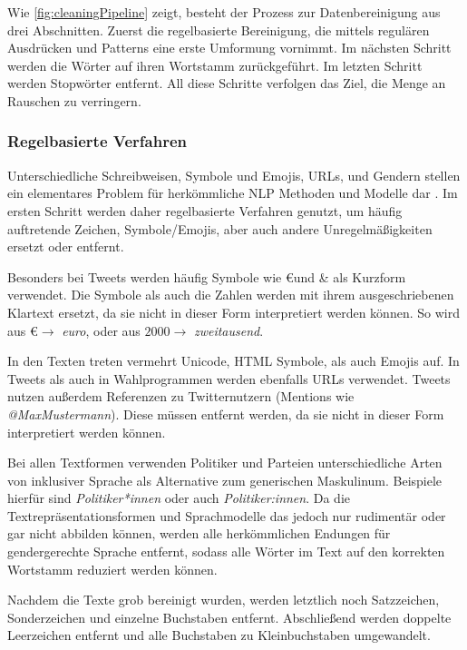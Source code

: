 Wie \autoref{fig:cleaningPipeline} zeigt, besteht der Prozess zur Datenbereinigung aus drei Abschnitten. Zuerst die regelbasierte Bereinigung, die mittels regulären Ausdrücken und Patterns eine erste Umformung vornimmt. Im nächsten Schritt werden die Wörter auf ihren Wortstamm zurückgeführt. Im letzten Schritt werden Stopwörter entfernt. All diese Schritte verfolgen das Ziel, die Menge an Rauschen zu verringern. 

\subsubsection{Regelbasierte Verfahren}

Unterschiedliche Schreibweisen, Symbole und Emojis, \acp{URL}, und Gendern stellen ein elementares Problem für herkömmliche \ac{NLP} Methoden und Modelle dar \autocite[4\psq]{kowsari_text_2019}. Im ersten Schritt werden daher regelbasierte Verfahren genutzt, um häufig auftretende Zeichen, Symbole/Emojis, aber auch andere Unregelmäßigkeiten ersetzt oder entfernt.

Besonders bei Tweets werden häufig Symbole wie \euro und \& als Kurzform verwendet. Die Symbole als auch die Zahlen werden mit ihrem ausgeschriebenen Klartext ersetzt, da sie nicht in dieser Form interpretiert werden können. So wird aus \euro \(\rightarrow\) \textit{euro}, oder aus \(\num{2000} \rightarrow\) \textit{zweitausend}.

In den Texten treten vermehrt Unicode, \ac{HTML} Symbole, als auch Emojis auf. In Tweets als auch in Wahlprogrammen werden ebenfalls \acp{URL} verwendet. Tweets nutzen außerdem Referenzen zu Twitternutzern (Mentions wie \textit{@MaxMustermann}). Diese müssen entfernt werden, da sie nicht in dieser Form interpretiert werden können.

Bei allen Textformen verwenden Politiker und Parteien unterschiedliche Arten von inklusiver Sprache als Alternative zum generischen Maskulinum. Beispiele hierfür sind \textit{Politiker*innen} oder auch \textit{Politiker:innen}. Da die Textrepräsentationsformen und Sprachmodelle das jedoch nur rudimentär oder gar nicht abbilden können, werden alle herkömmlichen Endungen für gendergerechte Sprache entfernt, sodass alle Wörter im Text auf den korrekten Wortstamm reduziert werden können.

Nachdem die Texte grob bereinigt wurden, werden letztlich noch Satzzeichen, Sonderzeichen und einzelne Buchstaben entfernt. Abschließend werden doppelte Leerzeichen entfernt und alle Buchstaben zu Kleinbuchstaben umgewandelt.

